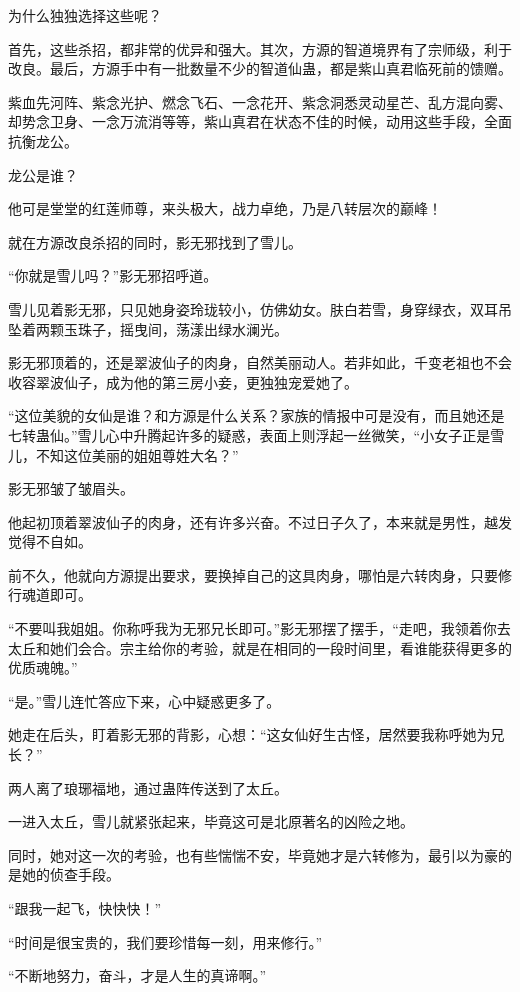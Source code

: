 \begin{this_body}
为什么独独选择这些呢？

首先，这些杀招，都非常的优异和强大。其次，方源的智道境界有了宗师级，利于改良。最后，方源手中有一批数量不少的智道仙蛊，都是紫山真君临死前的馈赠。

紫血先河阵、紫念光护、燃念飞石、一念花开、紫念洞悉灵动星芒、乱方混向雾、却势念卫身、一念万流消等等，紫山真君在状态不佳的时候，动用这些手段，全面抗衡龙公。

龙公是谁？

他可是堂堂的红莲师尊，来头极大，战力卓绝，乃是八转层次的巅峰！

就在方源改良杀招的同时，影无邪找到了雪儿。

“你就是雪儿吗？”影无邪招呼道。

雪儿见着影无邪，只见她身姿玲珑较小，仿佛幼女。肤白若雪，身穿绿衣，双耳吊坠着两颗玉珠子，摇曳间，荡漾出绿水澜光。

影无邪顶着的，还是翠波仙子的肉身，自然美丽动人。若非如此，千变老祖也不会收容翠波仙子，成为他的第三房小妾，更独独宠爱她了。

“这位美貌的女仙是谁？和方源是什么关系？家族的情报中可是没有，而且她还是七转蛊仙。”雪儿心中升腾起许多的疑惑，表面上则浮起一丝微笑，“小女子正是雪儿，不知这位美丽的姐姐尊姓大名？”

影无邪皱了皱眉头。

他起初顶着翠波仙子的肉身，还有许多兴奋。不过日子久了，本来就是男性，越发觉得不自如。

前不久，他就向方源提出要求，要换掉自己的这具肉身，哪怕是六转肉身，只要修行魂道即可。

“不要叫我姐姐。你称呼我为无邪兄长即可。”影无邪摆了摆手，“走吧，我领着你去太丘和她们会合。宗主给你的考验，就是在相同的一段时间里，看谁能获得更多的优质魂魄。”

“是。”雪儿连忙答应下来，心中疑惑更多了。

她走在后头，盯着影无邪的背影，心想：“这女仙好生古怪，居然要我称呼她为兄长？”

两人离了琅琊福地，通过蛊阵传送到了太丘。

一进入太丘，雪儿就紧张起来，毕竟这可是北原著名的凶险之地。

同时，她对这一次的考验，也有些惴惴不安，毕竟她才是六转修为，最引以为豪的是她的侦查手段。

“跟我一起飞，快快快！”

“时间是很宝贵的，我们要珍惜每一刻，用来修行。”

“不断地努力，奋斗，才是人生的真谛啊。”


\end{this_body}

